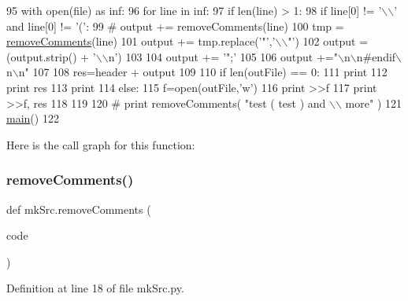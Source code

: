 \begin{DoxyCode}
95         with open(file) \textcolor{keyword}{as} inf:
96             \textcolor{keywordflow}{for} line \textcolor{keywordflow}{in} inf:
97                 \textcolor{keywordflow}{if} len(line) > 1:
98                     \textcolor{keywordflow}{if} line[0] != \textcolor{stringliteral}{'\(\backslash\)\(\backslash\)'} \textcolor{keywordflow}{and} line[0] != \textcolor{stringliteral}{'('}:
99 \textcolor{comment}{#                        output += removeComments(line)}
100                         tmp = \hyperlink{namespacemkSrc_a2295e28381950f839d54f2db1af19d21}{removeComments}(line)
101                         output += tmp.replace(\textcolor{stringliteral}{'"'},\textcolor{stringliteral}{'\(\backslash\)\(\backslash\)"'})
102                         output = (output.strip() + \textcolor{stringliteral}{'\(\backslash\)\(\backslash\)n'})
103 
104     output += \textcolor{stringliteral}{'";'}
105 
106     output +=\textcolor{stringliteral}{"\(\backslash\)n\(\backslash\)n#endif\(\backslash\)n\(\backslash\)n"}
107 
108     res=header + output
109 
110     \textcolor{keywordflow}{if} len(outFile) == 0:
111         \textcolor{keywordflow}{print}
112         \textcolor{keywordflow}{print} res
113         \textcolor{keywordflow}{print}
114     \textcolor{keywordflow}{else}:
115         f=open(outFile,\textcolor{stringliteral}{'w'})
116         \textcolor{keywordflow}{print} >>f
117         \textcolor{keywordflow}{print} >>f, res 
118 
119 
120 \textcolor{comment}{# print removeComments( "test      ( test ) and \(\backslash\)\(\backslash\) more" )}
121 \hyperlink{namespacemkSrc_a397eab54ba44c6e689aba237b2f0ef0a}{main}()
122 \end{DoxyCode}
Here is the call graph for this function\+:
\mbox{\label{namespacemkSrc_a2295e28381950f839d54f2db1af19d21}} 
\subsubsection{\texorpdfstring{remove\+Comments()}{removeComments()}}
{\footnotesize\ttfamily def mk\+Src.\+remove\+Comments (\begin{DoxyParamCaption}\item[{}]{code }\end{DoxyParamCaption})}



Definition at line 18 of file mk\+Src.\+py.



